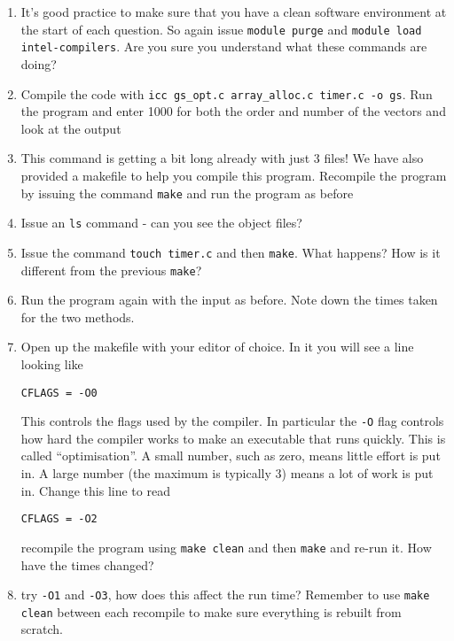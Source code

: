 \documentclass[a4paper, 12pt]{article}
\def \cc   {\tt }               %
\begin{document}
\begin{enumerate}

   \item It's good practice to make sure that you have a clean
    software environment at the start of each question. So
    again issue {\cc module purge} and
    {\cc module load intel-compilers}. Are you sure you
    understand what these commands are doing?

  \item Compile the code with {\cc icc gs\_opt.c array\_alloc.c timer.c -o gs}. Run the program
    and enter 1000 for both the order and number of the vectors and look at the output

  \item This command is getting a bit long already with just 3 files! We have also provided
    a makefile to help you compile this program. Recompile the program by issuing
    the command {\cc make} and run the program as before

  \item Issue an {\cc ls} command - can you see the object files?

  \item Issue the command {\cc touch timer.c} and then {\cc make}. What happens? How is it
    different from the previous {\cc make}?

  \item Run the program again with the input as before. Note down the times taken for the two methods.

  \item Open up the makefile with your editor of choice. In it you will see a line looking like

    {\cc CFLAGS = -O0}

    This controls the flags used by the compiler. In particular the {\cc -O} flag controls how hard the compiler
    works to make an executable that runs quickly. This is called ``optimisation''. A small number, such as zero, means
    little effort is put in. A large number (the maximum is typically 3) means a lot of work is put in. Change this line to read

    {\cc CFLAGS = -O2}

    recompile the program using {\cc make clean} and then {\cc make} and re-run it. How have the times changed?

  \item try {\cc -O1} and {\cc -O3}, how does this affect the run time? Remember to use {\cc make clean} between each recompile to make
    sure everything is rebuilt from scratch.

\end{enumerate}
\end{document}

